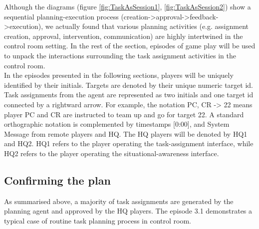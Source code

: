 Although the diagrams (figure \ref{fig:TaskAsSession1}, \ref{fig:TaskAsSession2}) show a sequential planning-execution process (creation->approval->feedback->execution), we actually found that various planning activities (e.g. assignment creation, approval, intervention, communication) are highly intertwined in the control room setting. In the rest of the section, episodes of game play will be used to unpack the interactions surrounding the task assignment activities in the control room.\\

In the episodes presented in the following sections, players will be uniquely identified by their initials. Targets are denoted by their unique numeric target id. Task assignments from the agent are represented as two initials and one target id connected by a rightward arrow. For example, the notation PC, CR -> 22 means player PC and CR are instructed to team up and go for target 22. A standard orthographic notation is complemented by timestamps [0:00], and System Message from remote players and HQ. The HQ players will be denoted by HQ1 and HQ2. HQ1 refers to the player operating the task-assignment interface, while HQ2 refers to the player operating the situational-awareness interface.\\

\subsection{Confirming the plan}
As summarised above, a majority of task assignments are generated by the planning agent and approved by the HQ players. The episode 3.1 demonstrates a typical case of routine task planning process in control room. \\

